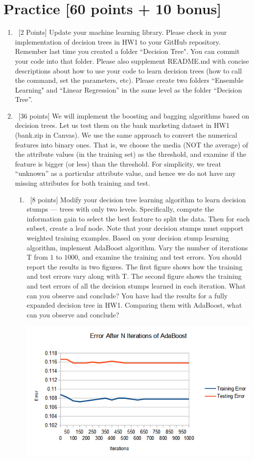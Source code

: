 \documentclass[12pt, fullpage,letterpaper]{article}
\begin{document}
\section{Practice [60 points + 10 bonus]}
\begin{enumerate}
	\item~[2 Points] Update your machine learning library. Please check in your implementation of decision trees in HW1 to your GitHub repository. Remember last time you created a folder ``Decision Tree". You can commit your code into that folder. Please also supplement README.md with concise descriptions about how to use your code to learn decision trees (how to call the command, set the parameters, etc). Please create two folders ``Ensemble Learning" and ``Linear Regression''  in the same level as the folder ``Decision Tree''.  


\item~[36 points] We will implement the boosting and bagging algorithms based on decision trees.  Let us test them on the bank marketing dataset in HW1 (bank.zip in Canvas). We use the same approach to convert the numerical features into binary ones. That is, we choose the media (NOT the average) of the attribute values (in the training set) as the threshold, and examine if the feature is bigger (or less) than the threshold.  For simplicity, we treat ``unknown'' as a particular attribute value, and hence we do not have any missing attributes for both training and test.
\begin{enumerate}
	\item~[8 points] Modify your decision tree learning algorithm to learn decision stumps ---  trees with only two levels. Specifically, compute the information gain to select the best feature to split the data. Then for each subset, create a leaf node. Note that your decision stumps must support weighted training examples. Based on your decision stump learning algorithm, implement AdaBoost algorithm. Vary the number of iterations T from $1$ to $1000$, and examine the training and test errors. You should report the results in two figures. The first figure shows how the training and test errors vary along with T. The second figure shows the training and test errors of all the decision stumps learned in each iteration. What can you observe and conclude? You have had the results for a fully expanded decision tree in HW1. Comparing them with AdaBoost, what can you observe and conclude?
	
	\includegraphics{adaboost_graph}
	

\end{enumerate}
\end{enumerate}
\end{document}
